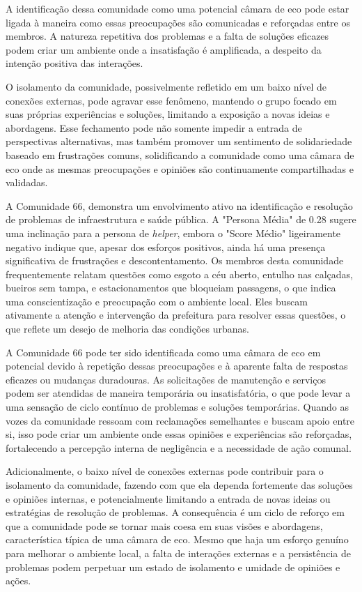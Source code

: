 A identificação dessa comunidade como uma potencial câmara de eco pode estar ligada à maneira como essas preocupações são comunicadas e reforçadas entre os membros. A natureza repetitiva dos problemas e a falta de soluções eficazes podem criar um ambiente onde a insatisfação é amplificada, a despeito da intenção positiva das interações.

O isolamento da comunidade, possivelmente refletido em um baixo nível de conexões externas, pode agravar esse fenômeno, mantendo o grupo focado em suas próprias experiências e soluções, limitando a exposição a novas ideias e abordagens. Esse fechamento pode não somente impedir a entrada de perspectivas alternativas, mas também promover um sentimento de solidariedade baseado em frustrações comuns, solidificando a comunidade como uma câmara de eco onde as mesmas preocupações e opiniões são continuamente compartilhadas e validadas.

A Comunidade 66, demonstra um envolvimento ativo na identificação e resolução de problemas de infraestrutura e saúde pública. A "Persona Média" de 0.28 sugere uma inclinação para a persona de \textit{helper}, embora o "Score Médio" ligeiramente negativo indique que, apesar dos esforços positivos, ainda há uma presença significativa de frustrações e descontentamento. Os membros desta comunidade frequentemente relatam questões como esgoto a céu aberto, entulho nas calçadas, bueiros sem tampa, e estacionamentos que bloqueiam passagens, o que indica uma conscientização e preocupação com o ambiente local. Eles buscam ativamente a atenção e intervenção da prefeitura para resolver essas questões, o que reflete um desejo de melhoria das condições urbanas.

A Comunidade 66 pode ter sido identificada como uma câmara de eco em potencial devido à repetição dessas preocupações e à aparente falta de respostas eficazes ou mudanças duradouras. As solicitações de manutenção e serviços podem ser atendidas de maneira temporária ou insatisfatória, o que pode levar a uma sensação de ciclo contínuo de problemas e soluções temporárias. Quando as vozes da comunidade ressoam com reclamações semelhantes e buscam apoio entre si, isso pode criar um ambiente onde essas opiniões e experiências são reforçadas, fortalecendo a percepção interna de negligência e a necessidade de ação comunal.

Adicionalmente, o baixo nível de conexões externas pode contribuir para o isolamento da comunidade, fazendo com que ela dependa fortemente das soluções e opiniões internas, e potencialmente limitando a entrada de novas ideias ou estratégias de resolução de problemas. A consequência é um ciclo de reforço em que a comunidade pode se tornar mais coesa em suas visões e abordagens, característica típica de uma câmara de eco. Mesmo que haja um esforço genuíno para melhorar o ambiente local, a falta de interações externas e a persistência de problemas podem perpetuar um estado de isolamento e umidade de opiniões e ações.


